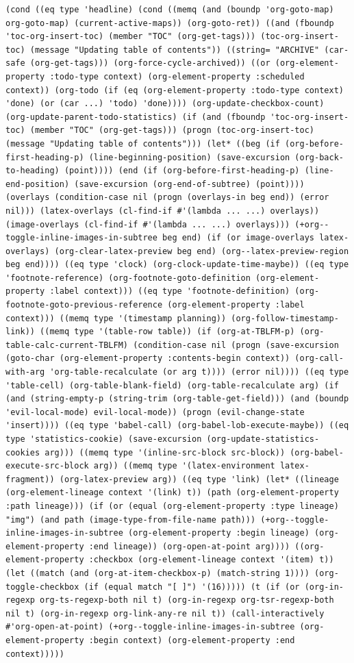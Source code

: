 \documentclass[11pt]{article}
\begin{document}
\begin{enumerate}
\begin{verbatim}
(cond ((eq type 'headline) (cond ((memq (and (boundp 'org-goto-map) org-goto-map) (current-active-maps)) (org-goto-ret)) ((and (fboundp 'toc-org-insert-toc) (member "TOC" (org-get-tags))) (toc-org-insert-toc) (message "Updating table of contents")) ((string= "ARCHIVE" (car-safe (org-get-tags))) (org-force-cycle-archived)) ((or (org-element-property :todo-type context) (org-element-property :scheduled context)) (org-todo (if (eq (org-element-property :todo-type context) 'done) (or (car ...) 'todo) 'done)))) (org-update-checkbox-count) (org-update-parent-todo-statistics) (if (and (fboundp 'toc-org-insert-toc) (member "TOC" (org-get-tags))) (progn (toc-org-insert-toc) (message "Updating table of contents"))) (let* ((beg (if (org-before-first-heading-p) (line-beginning-position) (save-excursion (org-back-to-heading) (point)))) (end (if (org-before-first-heading-p) (line-end-position) (save-excursion (org-end-of-subtree) (point)))) (overlays (condition-case nil (progn (overlays-in beg end)) (error nil))) (latex-overlays (cl-find-if #'(lambda ... ...) overlays)) (image-overlays (cl-find-if #'(lambda ... ...) overlays))) (+org--toggle-inline-images-in-subtree beg end) (if (or image-overlays latex-overlays) (org-clear-latex-preview beg end) (org--latex-preview-region beg end)))) ((eq type 'clock) (org-clock-update-time-maybe)) ((eq type 'footnote-reference) (org-footnote-goto-definition (org-element-property :label context))) ((eq type 'footnote-definition) (org-footnote-goto-previous-reference (org-element-property :label context))) ((memq type '(timestamp planning)) (org-follow-timestamp-link)) ((memq type '(table-row table)) (if (org-at-TBLFM-p) (org-table-calc-current-TBLFM) (condition-case nil (progn (save-excursion (goto-char (org-element-property :contents-begin context)) (org-call-with-arg 'org-table-recalculate (or arg t)))) (error nil)))) ((eq type 'table-cell) (org-table-blank-field) (org-table-recalculate arg) (if (and (string-empty-p (string-trim (org-table-get-field))) (and (boundp 'evil-local-mode) evil-local-mode)) (progn (evil-change-state 'insert)))) ((eq type 'babel-call) (org-babel-lob-execute-maybe)) ((eq type 'statistics-cookie) (save-excursion (org-update-statistics-cookies arg))) ((memq type '(inline-src-block src-block)) (org-babel-execute-src-block arg)) ((memq type '(latex-environment latex-fragment)) (org-latex-preview arg)) ((eq type 'link) (let* ((lineage (org-element-lineage context '(link) t)) (path (org-element-property :path lineage))) (if (or (equal (org-element-property :type lineage) "img") (and path (image-type-from-file-name path))) (+org--toggle-inline-images-in-subtree (org-element-property :begin lineage) (org-element-property :end lineage)) (org-open-at-point arg)))) ((org-element-property :checkbox (org-element-lineage context '(item) t)) (let ((match (and (org-at-item-checkbox-p) (match-string 1)))) (org-toggle-checkbox (if (equal match "[ ]") '(16))))) (t (if (or (org-in-regexp org-ts-regexp-both nil t) (org-in-regexp org-tsr-regexp-both nil t) (org-in-regexp org-link-any-re nil t)) (call-interactively #'org-open-at-point) (+org--toggle-inline-images-in-subtree (org-element-property :begin context) (org-element-property :end context)))))

\end{verbatim}
\end{enumerate}
\end{document}
